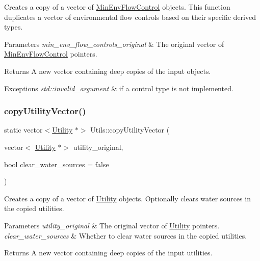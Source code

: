 Creates a copy of a vector of {\ttfamily \mbox{\hyperlink{classMinEnvFlowControl}{Min\+Env\+Flow\+Control}}} objects. This function duplicates a vector of environmental flow controls based on their specific derived types. 


\begin{DoxyParams}{Parameters}
{\em min\+\_\+env\+\_\+flow\+\_\+controls\+\_\+original} & The original vector of {\ttfamily \mbox{\hyperlink{classMinEnvFlowControl}{Min\+Env\+Flow\+Control}}} pointers.\\
\hline
\end{DoxyParams}
\begin{DoxyReturn}{Returns}
A new vector containing deep copies of the input objects.
\end{DoxyReturn}

\begin{DoxyExceptions}{Exceptions}
{\em std\+::invalid\+\_\+argument} & if a control type is not implemented. \\
\hline
\end{DoxyExceptions}
\mbox{\label{classUtils_aa640115dcdbe7309c058063c1f0cf943}} 
\subsubsection{\texorpdfstring{copy\+Utility\+Vector()}{copyUtilityVector()}}
{\footnotesize\ttfamily static vector$<$\mbox{\hyperlink{classUtility}{Utility}} $\ast$$>$ Utils\+::copy\+Utility\+Vector (\begin{DoxyParamCaption}\item[{vector$<$ \mbox{\hyperlink{classUtility}{Utility}} $\ast$$>$}]{utility\+\_\+original,  }\item[{bool}]{clear\+\_\+water\+\_\+sources = {\ttfamily false} }\end{DoxyParamCaption})\hspace{0.3cm}{\ttfamily [static]}}



Creates a copy of a vector of {\ttfamily \mbox{\hyperlink{classUtility}{Utility}}} objects. Optionally clears water sources in the copied utilities. 


\begin{DoxyParams}{Parameters}
{\em utility\+\_\+original} & The original vector of {\ttfamily \mbox{\hyperlink{classUtility}{Utility}}} pointers. \\
\hline
{\em clear\+\_\+water\+\_\+sources} & Whether to clear water sources in the copied utilities.\\
\hline
\end{DoxyParams}
\begin{DoxyReturn}{Returns}
A new vector containing deep copies of the input utilities. 
\end{DoxyReturn}
\mbox{\label{classUtils_af50f672b3a5c4790386d943e04e960f9}} 
